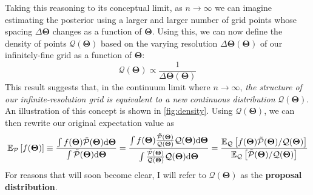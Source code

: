 \documentclass[12pt, titlepage]{article}
\newcommand{\deriv}{\ensuremath{{\rm d}}}  %
\newcommand{\meanwrt}[2]{\ensuremath{\mathbb{E}_{{#2}}\left[{#1}\right]}}
\newcommand{\params}{\ensuremath{\boldsymbol\Theta}}
\newcommand{\posterior}{\ensuremath{\mathcal{P}}}
\newcommand{\proposal}{\ensuremath{\mathcal{Q}}}
\begin{document}
Taking this reasoning to its conceptual limit, as $n \rightarrow \infty$
we can imagine estimating the posterior using a larger and larger number of 
grid points whose spacing $\Delta \params$ changes as a function of $\params$.
Using this, we can now define the density of points $\proposal(\params)$
based on the varying resolution $\Delta\params(\params)$ of our
infinitely-fine grid as a function of $\params$:
\begin{equation}
    \proposal(\params) \propto \frac{1}{\Delta\params (\params)}
\end{equation}
This result suggests that, in the continuum limit where $n \rightarrow \infty$, 
\textit{the structure of our infinite-resolution grid is equivalent to a new
continuous distribution} $\proposal(\params)$. An illustration
of this concept is shown in {\color{red} \autoref{fig:density}}. 
Using $\proposal(\params)$, we can 
then rewrite our original expectation value as
\begin{equation}
    \meanwrt{f(\params)}{\posterior} 
    \equiv \frac{\int f(\params) \tilde{\posterior}(\params) \deriv \params}
    {\int \tilde{\posterior}(\params) \deriv \params}
    = \frac{\int f(\params) \frac{\tilde{\posterior}(\params)}{\proposal(\params)}
    \proposal(\params) \deriv \params}
    {\int \frac{\tilde{\posterior}(\params)}{\proposal(\params)}
    \proposal(\params) \deriv \params}
    = \frac{\meanwrt{f(\params) 
    \tilde{\posterior}(\params)/\proposal(\params)}{\proposal}}
    {\meanwrt{\tilde{\posterior}(\params)/\proposal(\params)}{\proposal}}
\end{equation}
For reasons that will soon become clear, I will refer to 
$\proposal(\params)$ as the \textbf{proposal distribution}.
\end{document}
